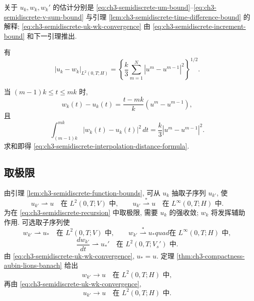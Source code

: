 \begin{Proof}
关于 $u_k,w_k,w_k'$ 的估计分别是 \eqref{eq:ch3-semidiscrete-um-bound}--\eqref{eq:ch3-semidiscrete-v-sum-bound} 与引理 \ref{lem:ch3-semidiscrete-time-difference-bound} 的解释; \eqref{eq:ch3-semidiscrete-uk-wk-convergence} 由 \eqref{eq:ch3-semidiscrete-increment-bound} 和下一引理推出.
\end{Proof}

\begin{Lemma}
\label{lem:ch3-semidiscrete-interpolation-distance}
有
\begin{equation}
|u_k-w_k|_{L^2(0,T;H)}
=\left\{\frac k3\sum_{m=1}^N|u^m-u^{m-1}|^2\right\}^{1/2}.
\label{eq:ch3-semidiscrete-interpolation-distance-formula}
\end{equation}
\end{Lemma}

\begin{Proof}
当 $(m-1)k\leq t\leq mk$ 时,
\[
w_k(t)-u_k(t)=\frac{t-mk}{k}(u^m-u^{m-1}),
\]
且
\[
\int_{(m-1)k}^{mk}|w_k(t)-u_k(t)|^2\,dt
=\frac k3|u^m-u^{m-1}|^2.
\]
求和即得 \eqref{eq:ch3-semidiscrete-interpolation-distance-formula}.
\end{Proof}

\subsection{取极限}
\label{subsec:ch3-semidiscrete-limit}
由引理 \ref{lem:ch3-semidiscrete-function-bounds}, 可从 $u_k$ 抽取子序列 $u_{k'}$, 使
\begin{equation}
u_{k'}\rightharpoonup u\quad\text{在 }L^2(0,T;V)\text{ 中},
\qquad
u_{k'}\overset{*}{\rightharpoonup}u\quad\text{在 }L^\infty(0,T;H)\text{ 中}.
\label{eq:ch3-semidiscrete-uk-weak-limits}
\end{equation}
为在 \eqref{eq:ch3-semidiscrete-recursion} 中取极限, 需要 $u_k$ 的强收敛; $w_k$ 将发挥辅助作用. 可选取子序列使
\begin{equation}
w_{k'}\rightharpoonup u_*\quad\text{在 }L^2(0,T;V)\text{ 中},
\qquad
w_{k'}\overset{*}{\rightharpoonup}u_*quad\text{在 }L^\infty(0,T;H)\text{ 中},
\label{eq:ch3-semidiscrete-wk-weak-limits}
\end{equation}
\begin{equation}
\frac{dw_{k'}}{dt}\rightharpoonup u_*'
\quad\text{在 }L^2(0,T;V_s')\text{ 中}.
\label{eq:ch3-semidiscrete-wk-derivative-limit}
\end{equation}
由 \eqref{eq:ch3-semidiscrete-uk-wk-convergence}, $u_*=u$. 定理 \ref{thm:ch3-compactness-aubin-lions-banach} 给出
\begin{equation}
w_{k'}\longrightarrow u\quad\text{在 }L^2(0,T;H)\text{ 中},
\label{eq:ch3-semidiscrete-wk-strong-limit}
\end{equation}
再由 \eqref{eq:ch3-semidiscrete-uk-wk-convergence},
\begin{equation}
u_{k'}\longrightarrow u\quad\text{在 }L^2(0,T;H)\text{ 中}.
\label{eq:ch3-semidiscrete-uk-strong-limit}
\end{equation}

